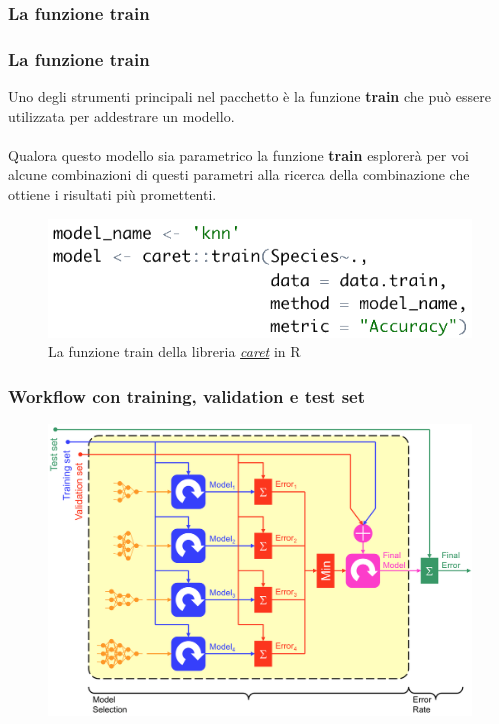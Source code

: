 \subsubsection[La funzione train]{La funzione train}
\begin{frame}
	
	\frametitle{La funzione \textbf{train}}
	
	
	Uno degli strumenti principali nel pacchetto è la funzione \textbf{train} che può essere utilizzata per addestrare un modello.\\\\
	Qualora questo modello sia parametrico la funzione \textbf{train} esplorerà per voi alcune combinazioni di questi parametri alla ricerca della combinazione che ottiene i risultati più promettenti.\\
	
	\begin{figure}[!htbp]
		\centering
		\includegraphics[width=0.75\linewidth]{images/supervised/coding/caret_train_1.png}
		\caption{La funzione train della libreria \href{https://github.com/topepo/caret}{\textit{caret}} in R}
	\end{figure}

\end{frame}



\begin{frame}

	\frametitle{Workflow con training, validation e test set}
	\begin{figure}[!htbp]
		\centering
		\includegraphics[width=0.85\linewidth]{images/supervised/validation_test_splitting_data/Workflow.png}
	\end{figure}
\end{frame}




